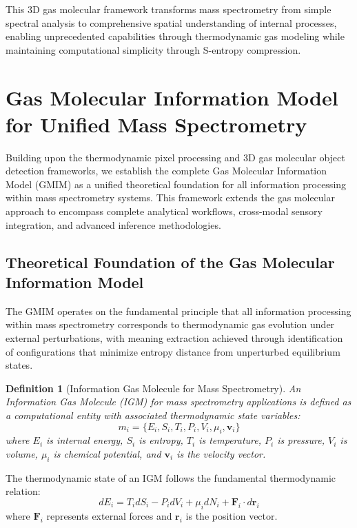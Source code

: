 \documentclass[11pt,a4paper]{article}
\newtheorem{definition}[theorem]{Definition}
\theoremstyle{remark}
\begin{document}
This 3D gas molecular framework transforms mass spectrometry from simple spectral analysis to comprehensive spatial understanding of internal processes, enabling unprecedented capabilities through thermodynamic gas modeling while maintaining computational simplicity through S-entropy compression.

\section{Gas Molecular Information Model for Unified Mass Spectrometry}

Building upon the thermodynamic pixel processing and 3D gas molecular object detection frameworks, we establish the complete Gas Molecular Information Model (GMIM) as a unified theoretical foundation for all information processing within mass spectrometry systems. This framework extends the gas molecular approach to encompass complete analytical workflows, cross-modal sensory integration, and advanced inference methodologies.

\subsection{Theoretical Foundation of the Gas Molecular Information Model}

The GMIM operates on the fundamental principle that all information processing within mass spectrometry corresponds to thermodynamic gas evolution under external perturbations, with meaning extraction achieved through identification of configurations that minimize entropy distance from unperturbed equilibrium states.

\begin{definition}[Information Gas Molecule for Mass Spectrometry]
An Information Gas Molecule (IGM) for mass spectrometry applications is defined as a computational entity with associated thermodynamic state variables:
$$m_i = \{E_i, S_i, T_i, P_i, V_i, \mu_i, \mathbf{v}_i\}$$
where $E_i$ is internal energy, $S_i$ is entropy, $T_i$ is temperature, $P_i$ is pressure, $V_i$ is volume, $\mu_i$ is chemical potential, and $\mathbf{v}_i$ is the velocity vector.
\end{definition}

The thermodynamic state of an IGM follows the fundamental thermodynamic relation:
$$dE_i = T_i dS_i - P_i dV_i + \mu_i dN_i + \mathbf{F}_i \cdot d\mathbf{r}_i$$
where $\mathbf{F}_i$ represents external forces and $\mathbf{r}_i$ is the position vector.
\end{document}
